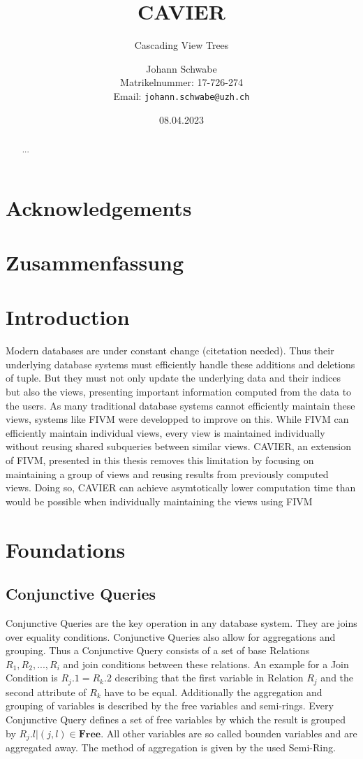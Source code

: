 \documentclass[abstracton,12pt]{scrreprt}
\title{CAVIER}
\subtitle{Cascading View Trees}
\author{
  Johann Schwabe\\[-5pt]
  \scriptsize Matrikelnummer: 17-726-274\\[-5pt]
  \scriptsize Email: \texttt{johann.schwabe@uzh.ch}
}
\date{\vspace*{2cm}08.04.2023}
\begin{document}
\maketitle

\chapter*{Acknowledgements}

\begin{abstract}
  ...
\end{abstract}

\chapter*{Zusammenfassung}

\tableofcontents
\listoffigures
\listoftables

\chapter{Introduction}
Modern databases are under constant change (citetation needed). Thus their underlying database systems must efficiently handle these additions and deletions of tuple. But they must not only update the underlying data and their indices but also the views, presenting important information computed from the data to the users. As many traditional database systems cannot efficiently maintain these views, systems like FIVM were developped to improve on this. While FIVM can efficiently maintain individual views, every view is maintained individually without reusing shared subqueries between similar views. CAVIER, an extension of FIVM, presented in this thesis removes this limitation by focusing on maintaining a group of views and reusing results from previously computed views. Doing so, CAVIER can achieve asymtotically lower computation time than would be possible when individually maintaining the views using FIVM

\chapter{Foundations}
\section{Conjunctive Queries}
Conjunctive Queries are the key operation in any database system. They are joins over equality conditions. Conjunctive Queries also allow for  aggregations and grouping. Thus a Conjunctive Query consists of a set of base Relations $R_1, R_2, ..., R_i$ and join conditions between these relations. An example for a Join Condition is $R_j.1 = R_k.2$ describing that the first variable in Relation $R_j$ and the second attribute of $R_k$ have to be equal. Additionally the aggregation and grouping of variables is described by the free variables and semi-rings. Every Conjunctive Query defines a set of free variables by which the result is grouped by $R_j.l | (j,l) \in \textbf{Free}$. All other variables are so called bounden variables and are aggregated away. The method of aggregation is given by the used Semi-Ring.
\end{document}
